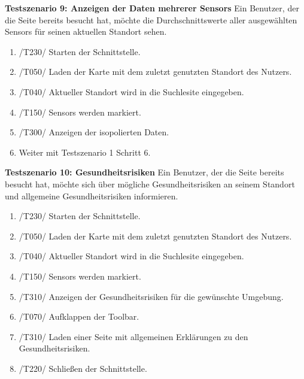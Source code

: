 \textbf{Testszenario 9: Anzeigen der Daten mehrerer \glspl{Sensor}}
\newline
Ein Benutzer, der die Seite bereits besucht hat, möchte die Durchschnittswerte aller ausgewählten \glspl{Sensor} für seinen aktuellen Standort sehen.
\begin{enumerate} [noitemsep]
    \item /T230/ Starten der Schnittstelle.
    \item /T050/ Laden der Karte mit dem zuletzt genutzten Standort des Nutzers.
    \item /T040/ Aktueller Standort wird in die Suchlesite eingegeben.
    \item /T150/ \glspl{Sensor} werden markiert.
    \item /T300/ Anzeigen der isopolierten Daten.
    \item Weiter mit Testszenario 1 Schritt 6.
\end{enumerate}

\textbf{Testszenario 10: Gesundheitsrisiken}
\newline
Ein Benutzer, der die Seite bereits besucht hat, möchte sich über mögliche Gesundheitsrisiken an seinem Standort und allgemeine Gesundheitsrisiken informieren.
\begin{enumerate} [noitemsep]
    \item /T230/ Starten der Schnittstelle.
    \item /T050/ Laden der Karte mit dem zuletzt genutzten Standort des Nutzers.
    \item /T040/ Aktueller Standort wird in die Suchlesite eingegeben.
    \item /T150/ \glspl{Sensor} werden markiert.
    \item /T310/ Anzeigen der Gesundheitsrisiken für die gewünschte Umgebung.
    \item /T070/ Aufklappen der \gls{Toolbar}.
    \item /T310/ Laden einer Seite mit allgemeinen Erklärungen zu den Gesundheitsrisiken.
    \item /T220/ Schließen der Schnittstelle.
\end{enumerate}
